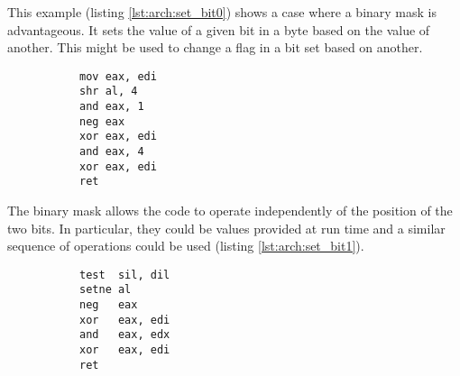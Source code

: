 This example (listing \ref{lst:arch:set_bit0}) shows a case where a binary mask
is advantageous.  It sets the value of a given bit in a byte based on the value
of another.  This might be used to change a flag in a bit set based on another.

\begin{figure}[ht]
    \centering
    \vspace{-\baselineskip}
    \begin{subfigure}[t]{0.5\textwidth}
        
    \end{subfigure}
    \hspace{2em}
    \begin{subfigure}[t]{0.2\textwidth}
        \begin{lstlisting}[style=x86]
mov eax, edi
shr al, 4
and eax, 1
neg eax
xor eax, edi
and eax, 4
xor eax, edi
ret
        \end{lstlisting}
    \end{subfigure}
    \vspace{-\baselineskip}
\end{figure}

The binary mask allows the code to operate independently of the position of the
two bits.  In particular, they could be values provided at run time and a
similar sequence of operations could be used (listing \ref{lst:arch:set_bit1}).

\begin{figure}[ht]
    \centering
    \vspace{-\baselineskip}
    \begin{subfigure}[t]{0.5\textwidth}
        
    \end{subfigure}
    \hspace{2em}
    \begin{subfigure}[t]{0.2\textwidth}
        \begin{lstlisting}[style=x86]
test  sil, dil
setne al
neg   eax
xor   eax, edi
and   eax, edx
xor   eax, edi
ret
        \end{lstlisting}
    \end{subfigure}
    \vspace{-\baselineskip}
\end{figure}

